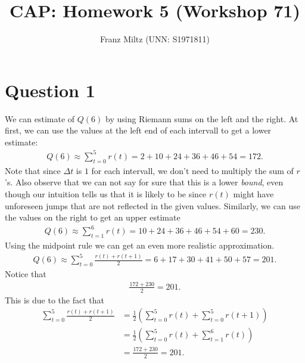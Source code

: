 \documentclass{article}
\title{CAP: Homework 5 (Workshop 71)}
\author{Franz Miltz (UNN: S1971811)}
\begin{document}
\maketitle
\section*{Question 1}
We can estimate of $Q(6)$ by using Riemann sums on the left and the right.
At first, we can use the values at the left end of each intervall to get a lower estimate:
\begin{align*}
  Q(6) \approx \sum_{t=0}^5 r(t)=2 + 10 + 24 +36 + 46+54=172.
\end{align*}
Note that since $\Delta t$ is $1$ for each intervall, we don't need to multiply the sum of $r$'s.
Also observe that we can not say for sure that this is a lower \emph{bound}, even though our intuition tells us that it is likely to be since $r(t)$ might have unforeseen jumps that are not reflected in the given values.
Similarly, we can use the values on the right to get an upper estimate
\begin{align*}
  Q(6) \approx \sum_{t=1}^6 r(t)=10+24+36+46+54+60=230.
\end{align*}
Using the midpoint rule we can get an even more realistic approximation.
\begin{align*}
  Q(6)\approx \sum_{t=0}^5 \frac{r(t)+r(t+1)}{2}=6+17+30+41+50+57=201.
\end{align*}
Notice that
\begin{align*}
  \frac{172+230}{2}=201.
\end{align*}
This is due to the fact that
\begin{align*}
  \sum_{t=0}^5\frac{r(t)+r(t+1)}{2}
  &=\frac{1}{2}\left(\sum_{t=0}^5 r(t)+\sum_{t=0}^5 r(t+1)\right)\\
  &=\frac{1}{2}\left(\sum_{t=0}^5 r(t)+\sum_{t=1}^6 r(t)\right)\\
  &=\frac{172+230}{2}=201.
\end{align*}
\end{document}
